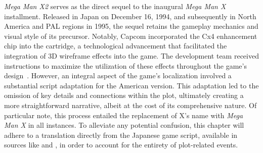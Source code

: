 
\textit{Mega Man X2} serves as the direct sequel to the inaugural \textit{Mega Man X} installment. Released in Japan on December 16, 1994, and subsequently in North America and PAL regions in 1995, the sequel retains the gameplay mechanics and visual style of its precursor. Notably, Capcom incorporated the Cx4 enhancement chip into the cartridge, a technological advancement that facilitated the integration of 3D wireframe effects into the game. The development team received instructions to maximize the utilization of these effects throughout the game's design~\cite{wiki:MMX2}. However, an integral aspect of the game's localization involved a substantial script adaptation for the American version. This adaptation led to the omission of key details and connections within the plot, ultimately creating a more straightforward narrative, albeit at the cost of its comprehensive nature. Of particular note, this process entailed the replacement of X's name with \textit{Mega Man X} in all instances. To alleviate any potential confusion, this chapter will adhere to a translation directly from the Japanese game script, available in sources like \cite{wordpress:X2_japanese_script} and \cite{gamesfaq:X2_japanese_script}, in order to account for the entirety of plot-related events.

